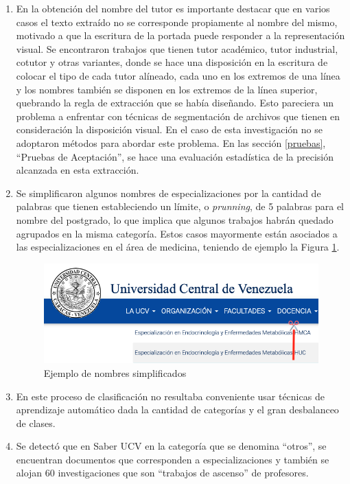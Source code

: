 \documentclass[
  12pt,
  openany]{book}
\begin{document}
\begin{enumerate}
\item
  En la obtención del nombre del tutor es importante destacar que en varios casos el texto extraído no se corresponde propiamente al nombre del mismo, motivado a que la escritura de la portada puede responder a la representación visual. Se encontraron trabajos que tienen tutor académico, tutor industrial, cotutor y otras variantes, donde se hace una disposición en la escritura de colocar el tipo de cada tutor alíneado, cada uno en los extremos de una línea y los nombres también se disponen en los extremos de la línea superior, quebrando la regla de extracción que se había diseñando. Esto pareciera un problema a enfrentar con técnicas de segmentación de archivos que tienen en consideración la disposición visual. En el caso de esta investigación no se adoptaron métodos para abordar este problema. En las sección \ref{pruebas}, ``Pruebas de Aceptación'', se hace una evaluación estadística de la precisión alcanzada en esta extracción.
\item
  Se simplificaron algunos nombres de especializaciones por la cantidad de palabras que tienen estableciendo un límite, o \emph{prunning}, de 5 palabras para el nombre del postgrado, lo que implica que algunos trabajos habrán quedado agrupados en la misma categoría. Estos casos mayormente están asociados a las especializaciones en el área de medicina, teniendo de ejemplo la Figura \ref{fig:especial}.

  \begin{figure}

  {\centering \includegraphics[width=0.7\linewidth]{images/05-desarrollo/1_ciclo/especializaciones2} 

  }

  \caption{Ejemplo de nombres simplificados}\label{fig:especial}
  \end{figure}
\item
  En este proceso de clasificación no resultaba conveniente usar técnicas de aprendizaje automático dada la cantidad de categorías y el gran desbalanceo de clases.
\item
  Se detectó que en Saber UCV en la categoría que se denomina ``otros'', se encuentran documentos que corresponden a especializaciones y también se alojan 60 investigaciones que son ``trabajos de ascenso'' de profesores.
\end{enumerate}
\end{document}
